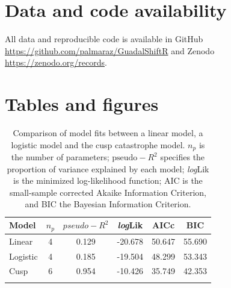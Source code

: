 \documentclass[12pt]{article}
\begin{document}
\section*{Data and code availability}
\label{sec:Data and code availability}

All data and reproducible code is available in GitHub \url{https://github.com/palmaraz/GuadalShiftR} and Zenodo \url{https://zenodo.org/records}.\\

\printbibliography

%
\newpage

\section*{Tables and figures}

\listoftables
\listoffigures

\newpage

	\begin{table}
		\centering
		\caption[Comparison of model fits between a linear model, a logistic model and the cusp catastrophe model]{Comparison of model fits between a linear model, a logistic model and the cusp catastrophe model. $ n_{p} $ is the number of parameters; $ \text{pseudo}-R^2 $ specifies the proportion of variance explained by each model; \textit{log}Lik is the minimized log-likelihood function; AIC is the small-sample corrected Akaike Information Criterion, and BIC the Bayesian Information Criterion.}
		\label{tab:TableCuspComp}
		\begin{tabular}{lccccc}%
			\toprule
			\textbf{Model} & \textbf{$ n_{p} $} & \textbf{$ pseudo-R^2 $} & \textbf{\textit{log}Lik} & \textbf{AICc} & \textbf{BIC} \\
			\midrule
			Linear & 4 & 0.129 & -20.678 & 50.647 & 55.690 \\
			Logistic & 4 & 0.185 & -19.504 & 48.299 & 53.343 \\
			Cusp & 6 & 0.954 & -10.426 & 35.749 & 42.353  \\
			\bottomrule
			& & & & & \\
		\end{tabular}
	\end{table}
	
\end{document}
